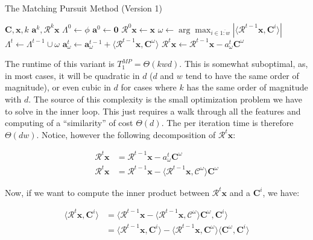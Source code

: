 \documentclass[12pt,a4paper,oneside,english]{UPBThesis}
\newcommand{\hcrange}[2]{\overline{{#1}\colon\!\!{#2}}}
\begin{document}
\begin{algorithm}
\caption{The Matching Pursuit Method (Version 1)}
\label{algo:MatchingPursuitMethodV1}
\begin{algorithmic}
\Require $\textbf{C},\textbf{x},k$
\Ensure $\textbf{a}^k,\mathcal{R}^k\textbf{x}$
\State $\Lambda^0 \gets \phi$
\State $\textbf{a}^0 \gets \textbf{0}$
\State $\mathcal{R}^0\textbf{x} \gets \textbf{x}$
\For {$t = \hcrange{1}{k}$}
\State $\omega \gets \arg \max_{i \in \hcrange{1}{w}} \left| \langle \mathcal{R}^{t-1}\textbf{x}, \textbf{C}^i \rangle \right|$
\State $\Lambda^t \gets \Lambda^{t-1} \cup \omega$
\State $\textbf{a}_\omega^t \gets \textbf{a}_\omega^{t-1} + \langle \mathcal{R}^{t-1}\textbf{x} , \textbf{C}^\omega \rangle$
\State $\mathcal{R}^t\textbf{x} \gets \mathcal{R}^{t-1}\textbf{x} - a_\omega^t\textbf{C}^\omega$
\EndFor
\end{algorithmic}
\end{algorithm}

The runtime of this variant is $T_1^{MP} = \Theta(kwd)$. This is somewhat suboptimal, as, in most cases, it will be quadratic in $d$ ($d$ and $w$ tend to have the same order of magnitude), or even cubic in $d$ for cases where $k$ has the same order of magnitude with $d$. The source of this complexity is the small optimization problem we have to solve in the inner loop. This just requires a walk through all the features and computing of a ``similarity'' of cost $\Theta(d)$. The per iteration time is therefore $\Theta(dw)$. Notice, however the following decomposition of $\mathcal{R}^t\textbf{x}$:

\begin{align*}
\mathcal{R}^t\textbf{x} & = \mathcal{R}^{t-1}\textbf{x} - a_\omega^t\textbf{C}^\omega \\
\mathcal{R}^t\textbf{x} & = \mathcal{R}^{t-1}\textbf{x} - \langle \mathcal{R}^{t-1}\textbf{x}, \mathcal{C}^\omega \rangle \textbf{C}^\omega
\end{align*}

Now, if we want to compute the inner product between $\mathcal{R}^t\textbf{x}$ and a $\textbf{C}^i$, we have:

\begin{align*}
\langle \mathcal{R}^t\textbf{x}, \textbf{C}^i \rangle & = \langle \mathcal{R}^{t-1}\textbf{x} - \langle \mathcal{R}^{t-1}\textbf{x}, \mathcal{C}^\omega \rangle \textbf{C}^\omega , \textbf{C}^i \rangle \\
& = \langle \mathcal{R}^{t-1}\textbf{x}, \textbf{C}^i \rangle - \langle \mathcal{R}^{t-1}\textbf{x}, \textbf{C}^\omega \rangle \langle \textbf{C}^\omega, \textbf{C}^i \rangle
\end{align*}
\end{document}
